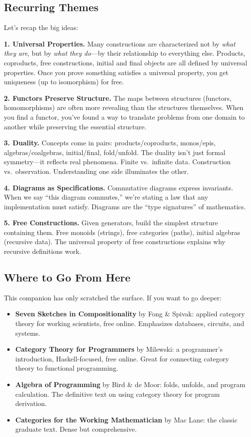 \documentclass[11pt]{article}
\theoremstyle{definition}
\theoremstyle{plain}
\theoremstyle{remark}
\begin{document}
\subsection{Recurring Themes}

Let's recap the big ideas:

\textbf{1. Universal Properties.} Many constructions are characterized not by \emph{what they are}, but by \emph{what they do}---by their relationship to everything else. Products, coproducts, free constructions, initial and final objects are all defined by universal properties. Once you prove something satisfies a universal property, you get uniqueness (up to isomorphism) for free.

\textbf{2. Functors Preserve Structure.} The maps between structures (functors, homomorphisms) are often more revealing than the structures themselves. When you find a functor, you've found a way to translate problems from one domain to another while preserving the essential structure.

\textbf{3. Duality.} Concepts come in pairs: products/coproducts, monos/epis, algebras/coalgebras, initial/final, fold/unfold. The duality isn't just formal symmetry---it reflects real phenomena. Finite vs.~infinite data. Construction vs.~observation. Understanding one side illuminates the other.

\textbf{4. Diagrams as Specifications.} Commutative diagrams express invariants. When we say ``this diagram commutes,'' we're stating a law that any implementation must satisfy. Diagrams are the ``type signatures'' of mathematics.

\textbf{5. Free Constructions.} Given generators, build the simplest structure containing them. Free monoids (strings), free categories (paths), initial algebras (recursive data). The universal property of free constructions explains why recursive definitions work.

\subsection{Where to Go From Here}

This companion has only scratched the surface. If you want to go deeper:

\begin{itemize}
  \item \textbf{Seven Sketches in Compositionality} by Fong \& Spivak: applied category theory for working scientists, free online. Emphasizes databases, circuits, and systems.
  \item \textbf{Category Theory for Programmers} by Milewski: a programmer's introduction, Haskell-focused, free online. Great for connecting category theory to functional programming.
  \item \textbf{Algebra of Programming} by Bird \& de Moor: folds, unfolds, and program calculation. The definitive text on using category theory for program derivation.
  \item \textbf{Categories for the Working Mathematician} by Mac Lane: the classic graduate text. Dense but comprehensive.
\end{itemize}
\end{document}
